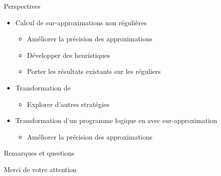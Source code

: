 \documentclass[xcolor={dvipsnames}]{beamer}
\begin{document}
\begin{frame}{Perspectives}
  \begin{itemize}[<+->]
  \item Calcul de sur-approximations non régulières
    \begin{itemize}
    \item Améliorer la précision des approximations
    \item Développer des heuristiques
    \item Porter les résultats existants sur les réguliers
    \end{itemize}
  \item Transformation de \pctrs
    \begin{itemize}
      \item Explorer d'autres stratégies
    \end{itemize}
  \item Transformation d'un programme logique en \csprogramme avec sur-approximation
    \begin{itemize}
    \item Améliorer la précision des approximations
    \end{itemize}
  \end{itemize}
\end{frame}

\begin{frame}{Remarques et questions}
  \begin{center}
    Merci de votre attention
  \end{center}
\end{frame}
\end{document}
